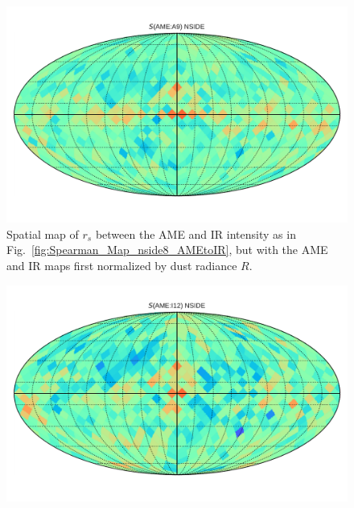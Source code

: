      \begin{figure}
       \includegraphics[width=\textwidth]{../Plots/Allsky_Corr/RadNorm/Spearman_Map_nside8_AMEtoA9.pdf}
       \centering
       \caption{Spatial map of $r_{s}$ between the AME and IR intensity as in Fig.~\ref{fig:Spearman_Map_nside8_AMEtoIR}, but with the AME and IR maps first normalized by dust radiance $R$.}
       \label{fig:Spearman_Map_nside8_AMEtoIR_radnorm_A9}
      \end{figure}
       \begin{figure}
        \includegraphics[width=\textwidth]{../Plots/Allsky_Corr/RadNorm/Spearman_Map_nside8_AMEtoI12.pdf}
        \centering
        \caption{}
        \label{fig:Spearman_Map_nside8_AMEtoIR_radnorm_I12}
      \end{figure}
